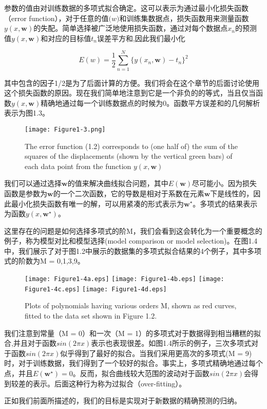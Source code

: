 	参数的值由对训练数据的多项式拟合确定。这可以表示为通过最小化损失函数（error function），对于任意的值$\mathbf(w)$和训练集数据点，损失函数用来测量函数$y(x,\mathbf{w})$的失配。简单选择被广泛地使用损失函数，通过对每个数据点$x_n$的预测值$y(x,\mathbf{w})$和对应的目标值$t_n$误差平方和,因此我们最小化
	
	\begin{equation}
	E(w) = \frac{1}{2} \sum_{n = 1}^{N}\{ y(x_n,\mathbf{w}) - t_n\}^2
	\end{equation}
	
	其中包含的因子1/2是为了后面计算的方便。我们将会在这个章节的后面讨论使用这个损失函数的原因。现在我们简单地注意到它是一个非负的的等式，当且仅当函数$y(x,\mathbf{w})$精确地通过每一个训练数据点的时候为0。函数平方误差和的几何解析表示为图1.3。
	
	
\begin{figure}
	\centering
	\texttt{[image: Figure1-3.png]}
	\caption{The error function (1.2) corresponds to (one half of) the sum of the squares of the displacements (shown by the vertical green bars) of each data point from the function $y(x,\mathbf{w})$ } 
	\label{fig:endb-flow} 
\end{figure}

	我们可以通过选择$\mathbf{w}$的值来解决曲线拟合问题，其中$E(\mathbf{w})$尽可能小。因为损失函数是参数为$\mathbf{w}$的一个二次函数，它的导数是相对于系数在元素$\mathbf{w}$下是线性的，因此最小化损失函数有唯一的解，可以用紧凑的形式表示为$\mathbf{w}^{\star}$。多项式的结果表示为函数$y(x,\mathbf{w}^{\star})$。
	
	这里存在的问题是如何选择多项式的阶M，我们会看到这会转化为一个重要概念的例子，称为模型对比和模型选择(model comparison or model selection)。在图1.4中，我们展示了对于图1.2中展示的数据集的多项式拟合结果的4个例子，其中多项式的阶数为M = 0,1,3,9。

\begin{figure}
	
	\texttt{[image: Figure1-4a.eps]}
	\texttt{[image: Figure1-4b.eps]}
	\texttt{[image: Figure1-4c.eps]}
	\texttt{[image: Figure1-4d.eps]}
	\caption{Plots of polynomials having various orders M, shown as red curves, fitted to the data set shown in
		Figure 1.2. } 
	\label{fig:endb-flow} 
\end{figure}

	我们注意到常量（M = 0）和一次（M = 1）的多项式对于数据得到相当糟糕的拟合,并且对于函数$sin(2 \pi x)$表示也表现很差。如图1.4所示的例子，三次多项式对于函数$sin(2 \pi x)$似乎得到了最好的拟合。当我们采用更高次的多项式(M = 9)时，对于训练数据，我们得到了一个较好的拟合。事实上，多项式精确地通过每个点，并且$E(\mathbf{w}^{\star}) = 0$。反而，拟合曲线较大范围的波动对于函数$sin(2 \pi x)$会得到较差的表示。后面这种行为称为过拟合（over-fitting）。
	
	正如我们前面所描述的，我们的目标是实现对于新数据的精确预测的归纳。